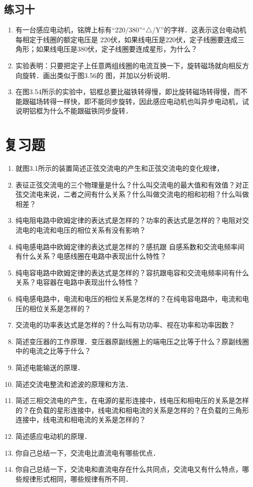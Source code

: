 \subsection*{练习十}
\begin{enumerate}
    \item 有一台感应电动机，铭牌上标有“220/380”“$\triangle$/Y”的字祥．这表示这台电动机每相定于线圈的额定电压是 220伏，如果线电压是220伏，定子线圈要连成三角形；如果线电压是380伏，定子线圈要连成星形，为什么？
    \item 实验表明：只要把定子上任意两组线圈的电流互换一下，旋转磁场就向相反方向旋转．画出类似于图3.56的
    图，并加以分析说明．
    \item 在图3.54所示的实验中，铝框总要比磁铁转得慢，即比旋转磁场转得慢，而不能跟磁场转得一样快，即不能同步旋转，因此感应电动机也叫异步电动机，试说明铝框为什么不能跟磁铁同步旋转．
\end{enumerate}

\section*{复习题}
\begin{enumerate}
\item 就图3.1所示的装置简述正弦交流电的产生和正弦交流电的变化规律，
\item 表征正弦交流电的三个物理量是什么？什么叫交流电的最大值和有效值？对正弦交流电来说，二者之间有什么关系？什么叫做交流电的相和初相？什么叫做相差？
\item 纯电阻电路中欧姆定律的表达式是怎样的？功率的表达式是怎样的？电阻对交流电的电流和电压的相位关系有没有影响？
\item 纯电感电路中欧姆定律的表达式是怎样的？感抗跟
自感系数和交流电频率间有什么关系？电感线圈在电路中表现出什么特性？
\item 纯电容电路中欧姆定律的表达式是怎样的？容抗跟电容和交流电频率间有什么关系？电容器在电路中表现出什么特性？
\item 纯电感电路中，电流和电压的相位关系是怎样的？在纯电容电路中，电流和电压的相位关系是怎样的？
\item 交流电的功率表达式是怎样的？什么叫有功功率、视在功率和功率因数？
\item 简述变压器的工作原理．变压器原副线圈上的端电压之比等于什么？原副线圈中的电流之比等于什么？
\item 简述电能输送的原理．
\item 简述交流电整流和滤波的原理和方法．
\item 简述三相交流电的产生，在电源的星形连接中，线电压和相电压的关系是怎样的？在负载的星形连接中，线电流和相电流的关系是怎样的？在负载的三角形连接中，线电流和相电流的关系是怎样的？
\item 简述感应电动机的原理．
\item 你自己总结一下，交流电比直流电有哪些优点．
\item 你自己总结一下，交流电和直流电存在什么共同点，交流电又有什么特点，哪些规律形式相同，哪些规律有所不同．
\end{enumerate}

